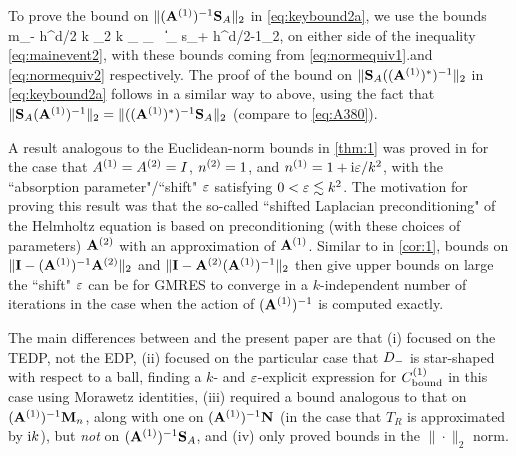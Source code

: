 To prove the bound on  $\|(\mathbf{A}^{(1)})^{-1}\mathbf{S}_A\|_{2}$ in \cref{eq:keybound2a}, we use the bounds 
\beqs
m_- h^{d/2} k \N{\tbu}_2 \leq k _{\LtDR} \leq {}_{\HokDR}
\,\tand\,
\big\|\nabla {}\big\|_{\LtDR} \leq s_+ h^{d/2-1}\N{\bff}_2,
\eeqs
on either side of the inequality \cref{eq:mainevent2}, with these bounds coming from \cref{eq:normequiv1}.and \cref{eq:normequiv2} respectively. The proof of the bound on 
$\|\mathbf{S}_A((\mathbf{A}^{(1)})^*)^{-1}\|_{2}$ in \cref{eq:keybound2a} follows in a similar way to above, using the fact that 
$\|\mathbf{S}_A (\mathbf{A}^{(1)})^{-1}\|_2=\|((\mathbf{A}^{(1)})^*)^{-1}\mathbf{S}_A\|_2$ (compare to \cref{eq:A380}).
\epf

A result analogous to the Euclidean-norm bounds in \cref{thm:1} was proved in \cite{GaGrSp:15} for the case that ${A}^{(1)}= {A}^{(2)}= I$, ${n}^{(2)}= 1$, and ${n}^{(1)} = 1 + \mathrm{i}\varepsilon/k^2$, with the ``absorption parameter"/``shift" $\varepsilon$ satisfying $0<\varepsilon\lesssim k^2$. The motivation for proving this result was that the so-called ``shifted Laplacian preconditioning" of the Helmholtz equation is based on preconditioning (with these choices of parameters) $\mathbf{A}^{(2)}$ with an approximation of $\mathbf{A}^{(1)}$. Similar to in \cref{cor:1}, bounds on $\|\mathbf{I} -  (\mathbf{A}^{(1)})^{-1}\mathbf{A}^{(2)} \|_2$ and 
$\|\mathbf{I} - \mathbf{A}^{(2)}  (\mathbf{A}^{(1)})^{-1}\|_2$
 then give upper bounds on large the ``shift" $\varepsilon$ can be for GMRES to converge in a $k$-independent number of iterations in the case when the action of $(\mathbf{A}^{(1)})^{-1}$ is computed exactly.

The main differences between \cite{GaGrSp:15} and the present paper are that (i)  \cite{GaGrSp:15} focused on the TEDP, not the EDP,
(ii) \cite{GaGrSp:15} focused on the particular case that $D_{-}$ is star-shaped with respect to a ball, finding a $k$- and $\varepsilon$-explicit expression for $C^{(1)}_{\rm bound}$ in this case using Morawetz identities,
(iii) \cite{GaGrSp:15} required a bound analogous to that on 
$(\mathbf{A}^{(1)})^{-1}\mathbf{M}_{n}$, along with one on $(\mathbf{A}^{(1)})^{-1}\mathbf{N}$ (in the case that $T_R$ is approximated by $\mathrm{i} k$), but \emph{not} on 
$(\mathbf{A}^{(1)})^{-1}\mathbf{S}_{A}$, and (iv) \cite{GaGrSp:15} only proved bounds in the $\|\cdot\|_2$ norm.
\ere

